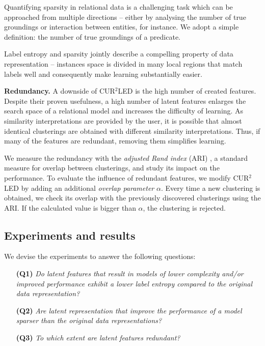 Quantifying sparsity in relational data is a challenging task which can be approached from multiple directions -- either by analysing the number of true groundings or interaction between entities, for instance.
We adopt a simple definition: the number of true groundings of a predicate.


Label entropy and sparsity jointly describe a compelling property of data representation --  instances space is divided in many local regions that match labels well  and consequently make learning substantially easier.



\textbf{Redundancy.} 
A downside of CUR$^2$LED is the high number of  created features. 
Despite their proven usefulness, a high number of latent features enlarges the search space of a relational model and increases the difficulty of learning.
As similarity interpretations are provided by the user, it is possible that almost identical clusterings are obtained with different similarity interpretations.
Thus, if many of the features are redundant, removing them simplifies learning.

We measure the redundancy with the \textit{adjusted Rand index} (ARI) \cite{Rand71,MoreyARI}, a standard measure for overlap between clusterings, and study its impact on the performance.
To evaluate the influence of redundant features, we modify CUR$^2$LED by adding an additional \textit{overlap parameter} $\alpha$.
Every time a new clustering is obtained, we check its overlap with the previously discovered clusterings using the ARI.
If the calculated value is bigger than $\alpha$, the clustering is rejected.



\subsection{Experiments and results}

We devise the experiments to answer the following questions:
\begin{itemize}
    \item[\textbf{(Q1)}] \textit{Do latent features that result in models of lower complexity and/or improved performance exhibit a lower label entropy compared to the original data representation?}
    \item[\textbf{(Q2)}] \textit{Are latent representation that improve the performance of a model sparser than the original data representations?}
    \item[\textbf{(Q3)}] \textit{To which extent are latent features redundant?}
\end{itemize}

